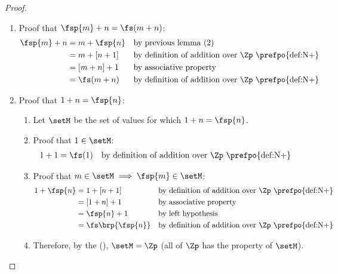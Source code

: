 \begin{proof}
\begin{enumerate}
  \item Proof that $\fsp{m}+n = \fs(m+n)$:
    \begin{align*}
      \fsp{m} + n
        &= m + \fsp{n}
        && \text{by previous lemma (2)}
      \\&= m + [n + 1]
        && \text{by definition of addition over $\Zp$ \prefpo{def:N+}}
      \\&= [m + n] + 1
        && \text{by associative property}
      \\&= \fs(m + n)
        && \text{by definition of addition over $\Zp$ \prefpo{def:N+}}
    \end{align*}

  \item Proof that $1+n=\fsp{n}$:
    \begin{enumerate}
      \item Let $\setM$ be the set of values for which $1+n=\fsp{n}$.
      \item Proof that $1\in\setM$:
        \begin{align*}
          1 + 1
            &= \fs(1)
            && \text{by definition of addition over $\Zp$ \prefpo{def:N+}}
        \end{align*}

      \item Proof that $m\in\setM\implies\fsp{m}\in\setM$:
        \begin{align*}
          1 + \fsp{n}
            &= 1 + [n+1]
            && \text{by definition of addition over $\Zp$ \prefpo{def:N+}}
          \\&= [1 + n] + 1
            && \text{by associative property}
          \\&= \fsp{n} + 1
            && \text{by left hypothesis}
          \\&= \fs\brp{\fsp{n}}
            && \text{by definition of addition over $\Zp$ \prefpo{def:N+}}
        \end{align*}

      \item Therefore, by the  (),
            $\setM=\Zp$ (all of $\Zp$ has the property of $\setM$).
    \end{enumerate}

\end{enumerate}
\end{proof}



